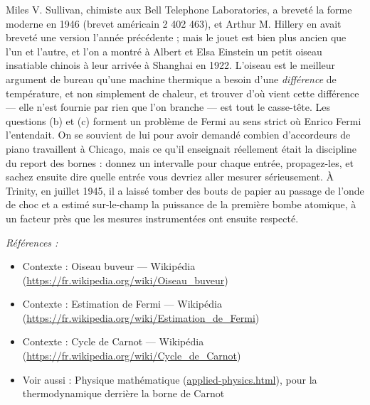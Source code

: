 \documentclass[11pt]{article}
\newenvironment{refs}{\par\small\noindent\emph{Références :}\begin{itemize}\setlength\itemsep{0pt}}{\end{itemize}\normalsize}
\begin{document}
\noindent Miles V. Sullivan, chimiste aux Bell Telephone Laboratories, a breveté la
forme moderne en 1946 (brevet américain 2 402 463), et Arthur M. Hillery en avait breveté
une version l'année précédente ; mais le jouet est bien plus ancien que l'un et l'autre, et
l'on a montré à Albert et Elsa Einstein un \og{} petit oiseau insatiable \fg{} chinois à leur
arrivée à Shanghai en 1922. L'oiseau est le meilleur argument de bureau qu'une machine
thermique a besoin d'une \textit{différence} de température, et non simplement de chaleur, et
trouver d'où vient cette différence --- elle n'est fournie par rien que l'on branche --- est
tout le casse-tête. Les questions (b) et (c) forment un problème de Fermi au sens strict où
Enrico Fermi l'entendait. On se souvient de lui pour avoir demandé combien d'accordeurs de
piano travaillent à Chicago, mais ce qu'il enseignait réellement était la discipline du
report des bornes : donnez un intervalle pour chaque entrée, propagez-les, et sachez ensuite
dire quelle entrée vous devriez aller mesurer sérieusement. À Trinity, en juillet 1945, il a
laissé tomber des bouts de papier au passage de l'onde de choc et a estimé sur-le-champ la
puissance de la première bombe atomique, à un facteur près que les mesures instrumentées ont
ensuite respecté.

\begin{refs}
\item Contexte : Oiseau buveur --- Wikipédia (\url{https://fr.wikipedia.org/wiki/Oiseau_buveur})
\item Contexte : Estimation de Fermi --- Wikipédia (\url{https://fr.wikipedia.org/wiki/Estimation_de_Fermi})
\item Contexte : Cycle de Carnot --- Wikipédia (\url{https://fr.wikipedia.org/wiki/Cycle_de_Carnot})
\item Voir aussi : Physique mathématique (\url{applied-physics.html}), pour la thermodynamique derrière la borne de Carnot
\end{refs}

\bigskip
\end{document}
